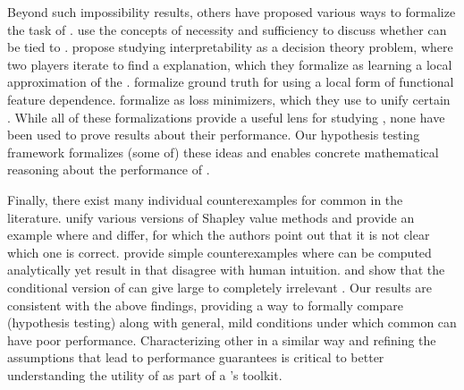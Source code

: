 Beyond such impossibility results, others have proposed various ways to formalize the task of \covname{} \attname{}.
%
\citet{watson21necessity} use the concepts of necessity and sufficiency to discuss whether \covname{} \attnames{} can be tied to \modbehaviourname{}.
%
\citet{watson21explanation} propose studying interpretability as a decision theory problem, where two players iterate to find a  explanation, which they formalize as learning a local approximation of the \modelname{}.
\citet{afchar21feature} formalize ground truth for \fielddefnames{} using a local form of functional feature dependence.
%
\citet{zhou22solvability} formalize \fielddefnames{} as loss minimizers, which they use to unify certain \methodnames{}.
While all of these formalizations provide a useful lens for studying \fielddefnames{}, none have been used to prove results about their performance.
Our hypothesis testing framework formalizes (some of) these ideas and enables concrete mathematical reasoning about the performance of \fielddefnames{}.

Finally, there exist many individual counterexamples for common \fielddefnames{} in the literature.
\citet{sundararajan20shapley} unify various versions of Shapley value methods and provide an example where \shap{} and \intgradshort{} differ, for which the authors point out that it is not clear which one is correct.
\citet{kumar20shapley} provide simple counterexamples where \shap{} 
%
can be computed analytically yet result in \attnames{} that disagree with human intuition.
\citet{merrick20explanation} and \citet{janzing20causal} show that the conditional version of \shap{} can give large \attname{} to completely irrelevant \covnames{}. 
%
%
%
Our results are consistent with the above findings, 
providing a way to formally compare \fielddefnames{} (hypothesis testing) along with general, mild conditions under which common \methodnames{} can have poor performance.
Characterizing other \fielddefnames{} in a similar way and refining the assumptions that lead to performance guarantees is critical to better understanding the utility of \covname{} \attname{} as part of a \username{}'s toolkit.

%


%


%